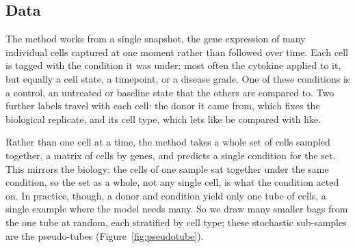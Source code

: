 \documentclass[11pt,a4paper]{article}
\newcommand{\rev}[1]{#1}  %
\begin{document}
\subsection{Data}
\label{sec:methods-data}
\rev{The method works from a single snapshot, the gene expression of many individual cells captured at one moment rather than followed over time.}
\rev{Each cell is tagged with the condition it was under: most often the cytokine applied to it, but equally a cell state, a timepoint, or a disease grade.}
\rev{One of these conditions is a control, an untreated or baseline state that the others are compared to.}
\rev{Two further labels travel with each cell: the donor it came from, which fixes the biological replicate, and its cell type, which lets like be compared with like.}

\rev{Rather than one cell at a time, the method takes a whole set of cells sampled together, a matrix of cells by genes, and predicts a single condition for the set.}
\rev{This mirrors the biology: the cells of one sample sat together under the same condition, so the set as a whole, not any single cell, is what the condition acted on.}
\rev{In practice, though, a donor and condition yield only one tube of cells, a single example where the model needs many.}
\rev{So we draw many smaller bags from the one tube at random, each stratified by cell type; these stochastic sub-samples are the pseudo-tubes (Figure~\ref{fig:pseudotube}).}
\end{document}
